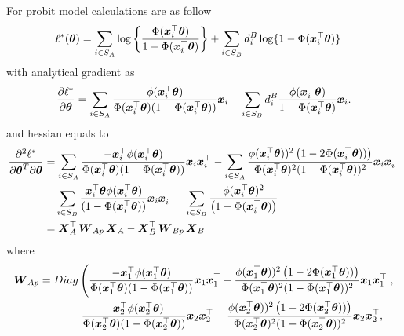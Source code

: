 \documentclass[
  letterpaper,
  DIV=11,
  numbers=noendperiod]{scrreprt}
\begin{document}
For probit model calculations are as follow \[
\begin{align*}
    \begin{split}
        \ell^{*}(\boldsymbol{\theta}) & = \sum_{i \in S_{A}}\log\left\{\frac{\Phi(\boldsymbol{x}_{i}^{\top}\boldsymbol{\theta})}{1 - \Phi(\boldsymbol{x}_{i}^{\top}\boldsymbol{\theta})}\right\} + \sum_{i \in S_{B}}d_{i}^{B}\log\{1 - \Phi(\boldsymbol{x}_{i}^{\top}\boldsymbol{\theta})\}
    \end{split}
\end{align*}
\] with analytical gradient as \[
        \frac{\partial \ell^*}{\partial\boldsymbol{\theta}} = \sum_{i \in S_A}\frac{\phi(\boldsymbol{x}_i^{\top}\boldsymbol{\theta})}{\Phi(\boldsymbol{x}_i^{\top}\boldsymbol{\theta})(1 - \Phi(\boldsymbol{x}_i^{\top}\boldsymbol{\theta}))}\boldsymbol{x}_i - \sum_{i \in S_B}d_i^B\frac{\phi(\boldsymbol{x}_i^{\top}\boldsymbol{\theta})}{1 - \Phi(\boldsymbol{x}_i^{\top}\boldsymbol{\theta})}\boldsymbol{x}_i.
\] and hessian equals to \[
\begin{align*}
    \begin{split}
\frac{\partial^{2} \ell^{*}}{\partial\boldsymbol{\theta}^{T} \partial\boldsymbol{\theta}} & = \sum_{i \in S_A}\frac{ - \boldsymbol{x}_i^{\top} \phi(\boldsymbol{x}_i^{\top}\boldsymbol{\theta})}{\Phi(\boldsymbol{x}_i^{\top}\boldsymbol{\theta})(1 - \Phi(\boldsymbol{x}_i^{\top}\boldsymbol{\theta}) )}\boldsymbol{x}_i\boldsymbol{x}_i^{\top} - \sum_{i \in S_A}\frac{\phi(\boldsymbol{x}_i^{\top}\boldsymbol{\theta}))^{2} \left(1 - 2\Phi(\boldsymbol{x}_i^{\top}\boldsymbol{\theta}))\right)}{\Phi(\boldsymbol{x}_i^{\top}\boldsymbol{\theta})^{2}(1 - \Phi(\boldsymbol{x}_i^{\top}\boldsymbol{\theta}) )^{2}}\boldsymbol{x}_i\boldsymbol{x}_i^{\top} \\ & - \sum_{i \in S_B}\frac{\boldsymbol{x}_i^{\top}\boldsymbol{\theta} \phi(\boldsymbol{x}_i^{\top}\boldsymbol{\theta})}{(1 -  \Phi(\boldsymbol{x}_i^{\top}\boldsymbol{\theta}))}\boldsymbol{x}_i\boldsymbol{x}_i^{\top} - \sum_{i \in S_B} \frac{\phi(\boldsymbol{x}_i^{\top}\boldsymbol{\theta})^{2}}{\left(1 - \Phi(\boldsymbol{x}_i^{\top}\boldsymbol{\theta}) \right)} \\ &=     \boldsymbol{X}_A^{\top}\operatorname{\boldsymbol{W}}_{Ap}\boldsymbol{X}_A - \boldsymbol{X}_B^{\top}\operatorname{\boldsymbol{W}}_{Bp}\boldsymbol{X}_B
    \end{split}
\end{align*}
\] where \[
\begin{align}
 \operatorname{\bW}_{Ap} =  Diag & \left(\frac{ - \bx_1^{\top} \phi(\bx_1^{\top}\btheta)}{\Phi(\bx_1^{\top}\btheta)(1 - \Phi(\bx_1^{\top}\btheta) )}\bx_1\bx_1^{\top} - \frac{\phi(\bx_1^{\top}\btheta))^{2} \left(1 - 2\Phi(\bx_1^{\top}\btheta))\right)}{\Phi(\bx_1^{\top}\btheta)^{2}(1 - \Phi(\bx_1^{\top}\btheta) )^{2}}\bx_1\bx_1^{\top} \right.,
    \\
    & \left. \frac{ - \bx_2^{\top} \phi(\bx_2^{\top}\btheta)}{\Phi(\bx_2^{\top}\btheta)(1 - \Phi(\bx_2^{\top}\btheta) )}\bx_2\bx_2^{\top} - \frac{\phi(\bx_2^{\top}\btheta))^{2} \left(1 - 2\Phi(\bx_2^{\top}\btheta))\right)}{\Phi(\bx_2^{\top}\btheta)^{2}(1 - \Phi(\bx_2^{\top}\btheta) )^{2}}\bx_2\bx_2^{\top}, \right.
    \\

\end{align}\]
\end{document}
